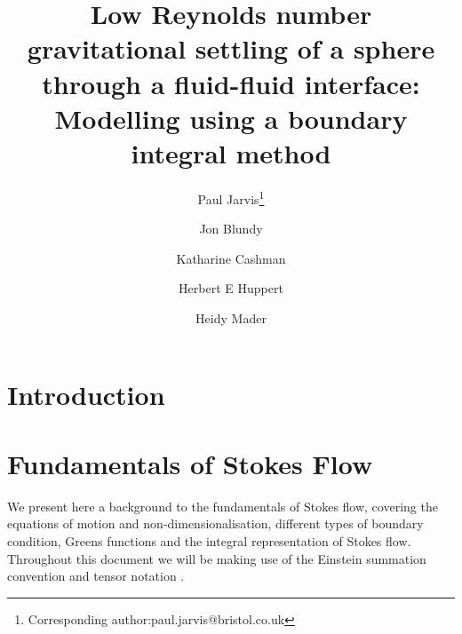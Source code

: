 \documentclass[12pt]{article}
\begin{document}
\thispagestyle{empty}

\title{Low Reynolds number gravitational settling of a sphere through a fluid-fluid interface: Modelling using a boundary integral method}

\author[1]{Paul Jarvis\footnote{Corresponding author:paul.jarvis@bristol.co.uk}}
\author[1]{Jon Blundy}
\author[1]{Katharine Cashman}
\author[1,2]{Herbert E Huppert}
\author[1]{Heidy Mader}
\date{}


\maketitle

\begin{abstract}


\end{abstract}


\section{Introduction}
\label{sec:intro}


\section{Fundamentals of Stokes Flow}
\label{sec:Stokes}

We present here a background to the fundamentals of Stokes flow, covering the equations of motion and non-dimensionalisation, different types of boundary condition, Greens functions and the integral representation of Stokes flow. Throughout this document we will be making use of the Einstein summation convention and tensor notation \citep{Riley06}.
\end{document}

